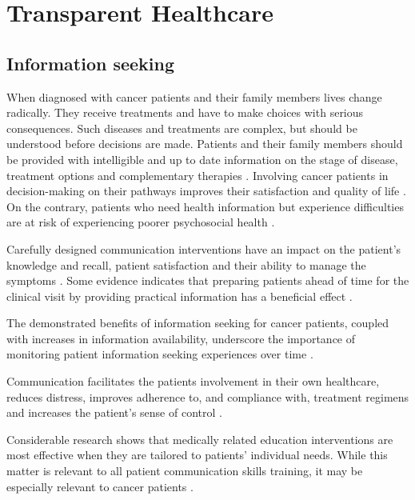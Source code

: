 \chapter{Transparent Healthcare}

\section{Information seeking}

When diagnosed with cancer patients and their family members lives change radically. They receive treatments and have to make choices with serious consequences. Such diseases and treatments are complex, but should be understood before decisions are made. Patients and their family members should be provided with intelligible and up to date information on the stage of disease, treatment options and complementary therapies \cite{butow_dynamics_1997,cassileth_information_1980}. Involving cancer patients in decision-making on their pathways improves their satisfaction and quality of life \cite{sheabudgell_information_2014}. On the contrary, patients who need health information but experience difficulties are at risk of experiencing poorer psychosocial health \cite{arora_barriers_2002}.

Carefully designed communication interventions have an impact on the patient's knowledge and recall, patient satisfaction and their ability to manage the symptoms \cite{johnson_effects_1982,hack_feasibility_1999,mohide_randomised_1996,mcpherson_effective_2001}. Some evidence indicates that preparing patients ahead of time for the clinical visit by providing practical information has a beneficial effect \cite{huchcroft_testing_1984,cegala_patient_2003}.

The demonstrated benefits of information seeking for cancer patients, coupled with increases in information availability, underscore the importance of monitoring patient information seeking experiences over time \cite{finney_rutten_cancer-related_2016}.

Communication facilitates the patients involvement in their own healthcare, reduces distress, improves adherence to, and compliance with, treatment regimens and increases the patient's sense of control \cite{viswanath_science_2005}.

Considerable research shows that medically related education interventions are most effective when they are tailored to patients' individual needs. While this matter is relevant to all patient communication skills training, it may be especially relevant to cancer patients \cite{cegala_patient_2003}.

